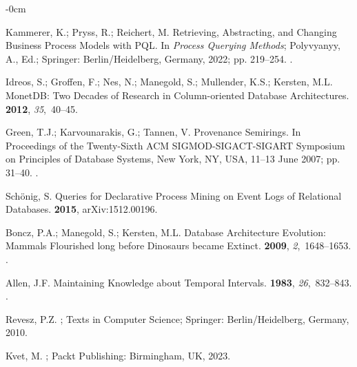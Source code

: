 \documentclass[information,article,accept,pdftex,oneauthor]{Definitions/mdpi}
\begin{document}
\begin{adjustwidth}{-\extralength}{0cm}
\begin{thebibliography}{999}
Kammerer, K.; Pryss, R.; Reichert, M.
\newblock Retrieving, Abstracting, and Changing Business Process Models with
  {PQL}. In {\em Process Querying Methods}; Polyvyanyy, A., Ed.; Springer:  {Berlin/Heidelberg, Germany,} 
  2022; pp. 219--254.
.

Idreos, S.; Groffen, F.; Nes, N.; Manegold, S.; Mullender, K.S.; Kersten, M.L.
\newblock MonetDB: Two Decades of Research in Column-oriented Database
  Architectures.
 {\bf 2012}, {\em 35},~40--45.

Green, T.J.; Karvounarakis, G.; Tannen, V.
\newblock Provenance Semirings.
\newblock In Proceedings of the Twenty-Sixth ACM
  SIGMOD-SIGACT-SIGART Symposium on Principles of Database Systems, New York,
  NY, USA, {11--13 June} 2007; pp. 31--40.
.

Sch{\"{o}}nig, S.
 Queries for Declarative Process Mining on Event Logs of
  Relational Databases.
 {\bf 2015}, {arXiv:1512.00196}.

Boncz, P.A.; Manegold, S.; Kersten, M.L.
\newblock Database Architecture Evolution: Mammals Flourished long before
  Dinosaurs became Extinct.
 {\bf 2009}, {\em 2},~1648--1653.
.

Allen, J.F.
\newblock Maintaining Knowledge about Temporal Intervals.
 {\bf 1983}, {\em 26},~832--843.
.

Revesz, P.Z.
;
  Texts in Computer Science; Springer:  {Berlin/Heidelberg, Germany,}   2010.

Kvet, M.
; Packt Publishing:  {Birmingham, UK}, 2023.


\end{thebibliography}
\end{adjustwidth}
\end{document}
